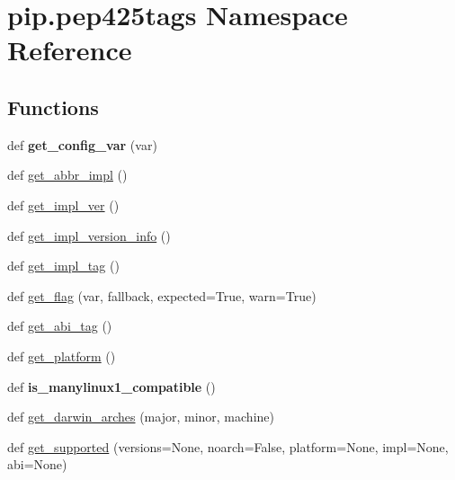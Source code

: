 \hypertarget{namespacepip_1_1pep425tags}{}\section{pip.\+pep425tags Namespace Reference}
\label{namespacepip_1_1pep425tags}
\subsection*{Functions}
\begin{DoxyCompactItemize}
\item 
\mbox{\label{namespacepip_1_1pep425tags_a9bbdef970d9efa6a5567f8375bd56c66}} 
def {\bfseries get\+\_\+config\+\_\+var} (var)
\item 
def \hyperlink{namespacepip_1_1pep425tags_a5728b64b870a5e696c67de254c167d62}{get\+\_\+abbr\+\_\+impl} ()
\item 
def \hyperlink{namespacepip_1_1pep425tags_a34bb0775cea16453eacb13c9f6c10d5d}{get\+\_\+impl\+\_\+ver} ()
\item 
def \hyperlink{namespacepip_1_1pep425tags_ab3a959a4b6cd0ecf4bd6668b8d394860}{get\+\_\+impl\+\_\+version\+\_\+info} ()
\item 
def \hyperlink{namespacepip_1_1pep425tags_ac3eee2c0d832af05428555a2da79e14c}{get\+\_\+impl\+\_\+tag} ()
\item 
def \hyperlink{namespacepip_1_1pep425tags_a6c08127e7266394e98a9a0d3ae411e37}{get\+\_\+flag} (var, fallback, expected=True, warn=True)
\item 
def \hyperlink{namespacepip_1_1pep425tags_a9eb1e9596e7d77559943f16182ba08d5}{get\+\_\+abi\+\_\+tag} ()
\item 
def \hyperlink{namespacepip_1_1pep425tags_ad671021e73547a714ef2da952dbffa4f}{get\+\_\+platform} ()
\item 
\mbox{\label{namespacepip_1_1pep425tags_a1935aaf0790537ad83979af39b70142e}} 
def {\bfseries is\+\_\+manylinux1\+\_\+compatible} ()
\item 
def \hyperlink{namespacepip_1_1pep425tags_adf0a925b9fa10bdc4ab0735112f3f679}{get\+\_\+darwin\+\_\+arches} (major, minor, machine)
\item 
def \hyperlink{namespacepip_1_1pep425tags_a4a5b16312b8aa61715a75c4b60b2f1b7}{get\+\_\+supported} (versions=None, noarch=False, platform=None, impl=None, abi=None)
\end{DoxyCompactItemize}
